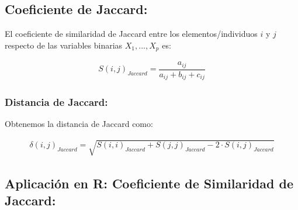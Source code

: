 \documentclass[12pt]{report} %
\begin{document}
\newpage













\subsection{Coeficiente de Jaccard:}

\begin{tcolorbox}[toptitle=2mm,title=  Coeficiente de Jaccard:   ]
El coeficiente de similaridad de Jaccard entre los elementos/individuos $i$ y $j$ respecto de las variables binarias $X_1,...,X_p$ es:

\begin{gather*}
S(i,j)_{Jaccard}  = \dfrac{a_{ij} }{a_{ij} + b_{ij}+ c_{ij}} 
\end{gather*}

\end{tcolorbox}


\subsubsection{Distancia de Jaccard:}

\begin{tcolorbox}[toptitle=2mm,title=  Distancia de Jaccard:   ]

Obtenemos la distancia de Jaccard como:

\begin{gather*}
\delta(i,j)_{Jaccard} = \sqrt{S(i,i)_{Jaccard} +S(j,j)_{Jaccard} - 2\cdot S(i,j)_{Jaccard} }
\end{gather*}

\end{tcolorbox}

\newpage

\subsection{Aplicación en R: Coeficiente de Similaridad de Jaccard:}
\end{document}
